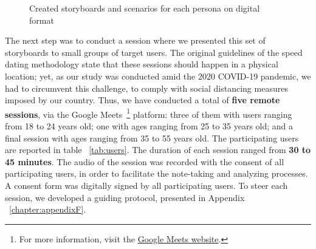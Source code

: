 \begin{figure}[htbp]
	\centering
	 \qquad
		 \qquad
	\caption{Created storyboards and scenarios for each persona on digital format}
	\label{fig:digitalstoryboard}
\end{figure}



The next step was to conduct a session where we presented this set of storyboards to small groups of target users. The original guidelines of the speed dating methodology state that these sessions should happen in a physical location; yet, as our study was conducted amid the 2020 COVID-19 pandemic, we had to circumvent this challenge, to comply with social distancing measures imposed by our country. Thus, we have conducted a total of \textbf{five remote sessions}, via the Google Meets~\footnote{For more information, visit the \href{http://meets.google.com/}{Google Meets website}.} platform: three of them with users ranging from 18 to 24 years old; one with ages ranging from 25 to 35 years old; and a final session with ages ranging from 35 to 55 years old. The participating users are reported in table ~\ref{tab:users}. The duration of each session ranged from \textbf{30 to 45 minutes}. The audio of the session was recorded with the consent of all participating users, in order to facilitate the note-taking and analyzing processes. A consent form was digitally signed by all participating users. To steer each session, we developed a guiding protocol, presented in Appendix ~\ref{chapter:appendixF}.

